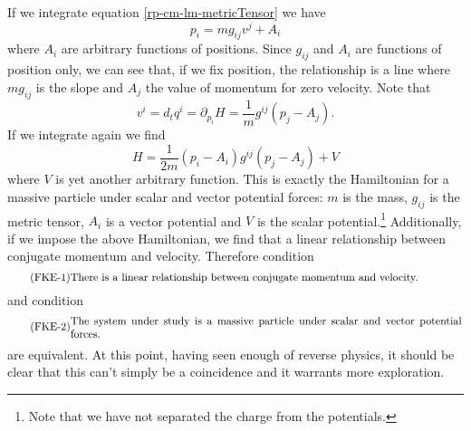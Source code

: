 If we integrate equation \ref{rp-cm-lm-metricTensor} we have
\begin{equation}
	p_i = m g_{ij} v^j + A_i
\end{equation}
where $A_i$ are arbitrary functions of positions. Since $g_{ij}$ and $A_i$ are functions of position only, we can see that, if we fix position, the relationship is a line where $mg_{ij}$ is the slope and $A_j$ the value of momentum for zero velocity. Note that
\begin{equation}
	v^i = d_t q^i = \partial_{p_i} H = \frac{1}{m} g^{ij}(p_j - A_j).
\end{equation}
If we integrate again we find
\begin{equation}
	H = \frac{1}{2m}(p_i - A_i)g^{ij}(p_j - A_j) + V
\end{equation}
where $V$ is yet another arbitrary function. This is exactly the Hamiltonian for a massive particle under scalar and vector potential forces: $m$ is the mass, $g_{ij}$ is the metric tensor, $A_i$ is a vector potential and $V$ is the scalar potential.\footnote{Note that we have not separated the charge from the potentials.} Additionally, if we impose the above Hamiltonian, we find that a linear relationship between conjugate momentum and velocity. Therefore condition
\begin{equation}\label{rp-cm-fke-condLinearRelationship}
	\tag{FKE-1}
	\parbox{5in}{There is a linear relationship between conjugate momentum and velocity.}
\end{equation}
and condition
\begin{equation}\label{rp-cm-fke-condMassiveParticle}
	\tag{FKE-2}
	\parbox{5in}{The system under study is a massive particle under scalar and vector potential forces.}
\end{equation}
are equivalent. At this point, having seen enough of reverse physics, it should be clear that this can't simply be a coincidence and it warrants more exploration.

